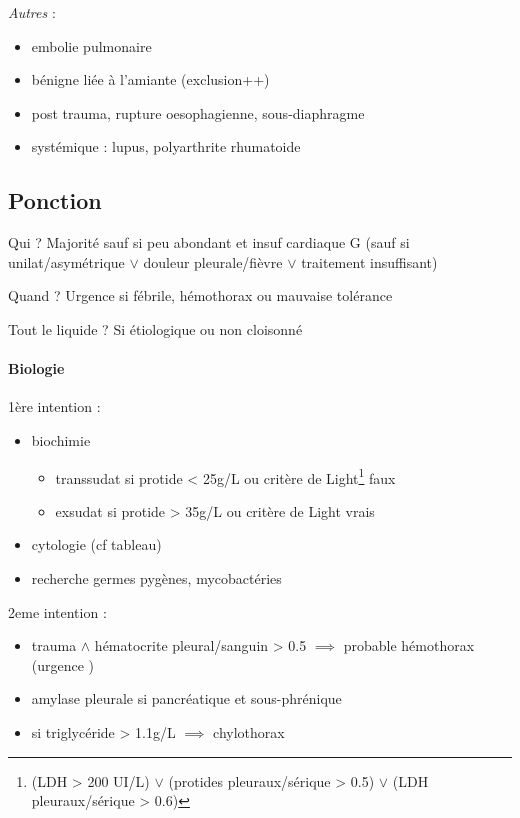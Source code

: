 \documentclass{article}
\begin{document}
\textit{Autres}  :
\begin{itemize}
\item embolie pulmonaire
\item bénigne liée à l'amiante (exclusion++)
\item post trauma, rupture oesophagienne, sous-diaphragme
\item systémique : lupus, polyarthrite rhumatoide
\end{itemize}

\subsection{Ponction}
Qui ? Majorité sauf si peu abondant et insuf cardiaque G (sauf si
unilat/asymétrique $\vee$ douleur pleurale/fièvre $\vee$ traitement insuffisant)

Quand ? Urgence si fébrile, hémothorax ou mauvaise tolérance

Tout le liquide ? Si étiologique ou non cloisonné

\paragraph{Biologie}
1ère intention :
\begin{itemize}
\item biochimie
  \begin{itemize}
  \item transsudat si protide < 25g/L ou critère de Light\footnote{
(LDH > 200 UI/L) $\vee$ (protides pleuraux/sérique > 0.5) $\vee$ (LDH
pleuraux/sérique > 0.6)} faux
  \item exsudat si protide > 35g/L ou critère de Light vrais
  \end{itemize}
\item cytologie (cf tableau)
\item recherche germes pygènes, mycobactéries
\end{itemize}

2eme intention :
\begin{itemize}
\item trauma $\wedge$ hématocrite pleural/sanguin > 0.5 $\implies$ probable
  hémothorax (urgence \danger)
\item amylase pleurale si pancréatique et sous-phrénique
\item si triglycéride > 1.1g/L $\implies$ chylothorax
\end{itemize}
\end{document}
